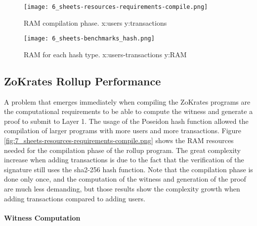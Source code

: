 \begin{figure}
	\centering
	\begin{minipage}{.5\textwidth}
		\centering
		\texttt{[image: 6\_sheets-resources-requirements-compile.png]}
		\caption[RAM Compile]{RAM compilation phase. \newline x:users y:transactions}
		\label{fig:7_sheets-resources-requirements-compile.png}
	\end{minipage}%
	\begin{minipage}{.5\textwidth}
		\centering
		\texttt{[image: 6\_sheets-benchmarks\_hash.png]}
		\caption[RAM Usage hash]{RAM for each hash type. \newline x:users-transactions y:RAM}
		\label{fig:7_sheets-benchmarks_hash.png}
	\end{minipage}
\end{figure}

\subsection{ZoKrates Rollup Performance\label{subsec:6_zokratesperf}}

A problem that emerges immediately when compiling the ZoKrates programs are the computational requirements to be able to compute the witness and generate a proof to submit to Layer 1. The usage of the Poseidon hash function allowed the compilation of larger programs with more users and more transactions. Figure \ref{fig:7_sheets-resources-requirements-compile.png} shows the RAM resources needed for the compilation phase of the rollup program. The great complexity increase when adding transactions is due to the fact that the verification of the signature still uses the sha2-256 hash function. Note that the compilation phase is done only once, and the computation of the witness and generation of the proof are much less demanding, but those results show the complexity growth when adding transactions compared to adding users.

\paragraph{Witness Computation}

